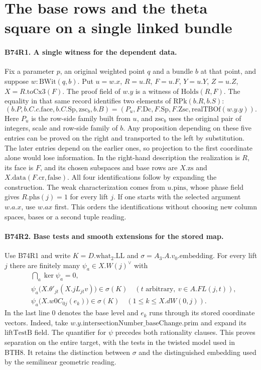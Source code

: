 \section{The base rows and the theta square on a single linked bundle}

\paragraph{B74R1. A single witness for the dependent data.}
Fix a parameter $p$, an original weighted point $q$ and a bundle $b$ at
that point, and suppose $w:\mathrm{BWit}(q,b)$. Put $u=w.x$,
$R=u.R$, $F=u.F$, $Y=u.Y$, $Z=u.Z$, $X=R.\mathrm{toCx3}(F)$.
The proof field of $w.y$ is a witness of $\mathrm{Holds}(R,F)$.
The equality in that same record identifies two elements of
$\mathrm{RPk}(b.R,b.S)$:
\[
 (b.P,b.C.c.\mathrm{face},b.C.\mathrm{Sp},\mathrm{zsc}_b,b.B)
 =
 (P_u,F.\mathrm{Dc},F.\mathrm{Sp},F.\mathrm{Zsc},
            \mathrm{realTBOf}(w.y.y)).
\]
Here $P_u$ is the row-side family built from $u$, and $\mathrm{zsc}_b$
uses the original pair of integers, scale and row-side family of $b$.
Any proposition depending on these five entries can be proved on the
right and transported to the left by substitution. The later entries
depend on the earlier ones, so projection to the first coordinate
alone would lose information. In the right-hand description the
realization is $R$, its face is $F$, and its chosen subspaces and
base rows are $X.\mathrm{zs}$ and $X.\mathrm{data}(F.\mathrm{cr},
\mathrm{false})$. All four identifications follow by expanding the
construction. The weak characterization comes from $u.\mathrm{pins}$,
whose phase field gives $R.\mathrm{phs}(j)=1$ for every lift $j$.
If one starts with the selected argument $w.a.x$, use $w.ax$ first.
This orders the identifications without choosing new column
spaces, bases or a second tuple reading.

\paragraph{B74R2. Base tests and smooth extensions for the stored map.}
Use B74R1 and write $K=D.\mathrm{what}_2.\mathrm{LL}$ and
$\sigma=A_3.A.v_0.\mathrm{embedding}$. For every lift $j$ there
are finitely many $\psi_a\in X.W(j)^\vee$ with
\[
 \begin{split}
 &\bigcap_a \ker\psi_a=0,\\
 &\psi_a\bigl(X.\theta'_{jt}(X.jL_{jt}v)\bigr)\in\sigma(K)
               \quad(t\text{ arbitrary},\ v\in A.FL(j,t)),\\
 &\psi_a\bigl(X.w0C_{0j}(e_k)\bigr)\in\sigma(K)
               \quad(1\le k\le X.dW(0,j)).
 \end{split}
\]
In the last line $0$ denotes the base level and $e_k$ runs through
its stored coordinate vectors. Indeed, take
$w.y.\mathrm{intersectionNumber\_baseChange}.\mathrm{prim}$ and
expand its $\mathrm{liftTestB}$ field. The quantifier for $\psi$
precedes both rationality clauses. This proves separation on the
entire target, with the tests in the twisted model used in BTH8.
It retains the distinction between $\sigma$ and the distinguished
embedding used by the semilinear geometric reading.

